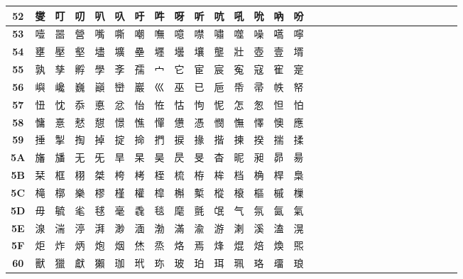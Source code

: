 \begin{table}[H]
\begin{tabular}{|Sc|Sc|Sc|Sc|Sc|Sc|Sc|Sc|Sc|Sc|Sc|Sc|Sc|Sc|Sc|}
\textbf{52} & 燮 & 叮 & 叨 & 叭 & 叺 & 吁 & 吽 & 呀 & 听 & 吭 & 吼 & 吮 & 吶 & 吩 \\ \hline
\textbf{53} & 噎 & 噐 & 營 & 嘴 & 嘶 & 嘲 & 嘸 & 噫 & 噤 & 嘯 & 噬 & 噪 & 嚆 & 嚀 \\ \hline
\textbf{54} & 壅 & 壓 & 壑 & 壗 & 壙 & 壘 & 壥 & 壜 & 壤 & 壟 & 壯 & 壺 & 壹 & 壻 \\ \hline
\textbf{55} & 孰 & 孳 & 孵 & 學 & 斈 & 孺 & 宀 & 它 & 宦 & 宸 & 寃 & 寇 & 寉 & 寔 \\ \hline
\textbf{56} & 嶼 & 巉 & 巍 & 巓 & 巒 & 巖 & 巛 & 巫 & 已 & 巵 & 帋 & 帚 & 帙 & 帑 \\ \hline
\textbf{57} & 忸 & 忱 & 忝 & 悳 & 忿 & 怡 & 恠 & 怙 & 怐 & 怩 & 怎 & 怱 & 怛 & 怕 \\ \hline
\textbf{58} & 慵 & 憙 & 憖 & 憇 & 憬 & 憔 & 憚 & 憊 & 憑 & 憫 & 憮 & 懌 & 懊 & 應 \\ \hline
\textbf{59} & 捶 & 掣 & 掏 & 掉 & 掟 & 掵 & 捫 & 捩 & 掾 & 揩 & 揀 & 揆 & 揣 & 揉 \\ \hline
\textbf{5A} & 旛 & 旙 & 无 & 旡 & 旱 & 杲 & 昊 & 昃 & 旻 & 杳 & 昵 & 昶 & 昴 & 昜 \\ \hline
\textbf{5B} & 栞 & 框 & 栩 & 桀 & 桍 & 栲 & 桎 & 梳 & 栫 & 桙 & 档 & 桷 & 桿 & 梟 \\ \hline
\textbf{5C} & 槞 & 槨 & 樂 & 樛 & 槿 & 權 & 槹 & 槲 & 槧 & 樅 & 榱 & 樞 & 槭 & 樔 \\ \hline
\textbf{5D} & 毋 & 毓 & 毟 & 毬 & 毫 & 毳 & 毯 & 麾 & 氈 & 氓 & 气 & 氛 & 氤 & 氣 \\ \hline
\textbf{5E} & 湶 & 湍 & 渟 & 湃 & 渺 & 湎 & 渤 & 滿 & 渝 & 游 & 溂 & 溪 & 溘 & 滉 \\ \hline
\textbf{5F} & 炬 & 炸 & 炳 & 炮 & 烟 & 烋 & 烝 & 烙 & 焉 & 烽 & 焜 & 焙 & 煥 & 煕 \\ \hline
\textbf{60} & 獸 & 獵 & 獻 & 獺 & 珈 & 玳 & 珎 & 玻 & 珀 & 珥 & 珮 & 珞 & 璢 & 琅 \\ \hline
\end{tabular}
\end{table}

